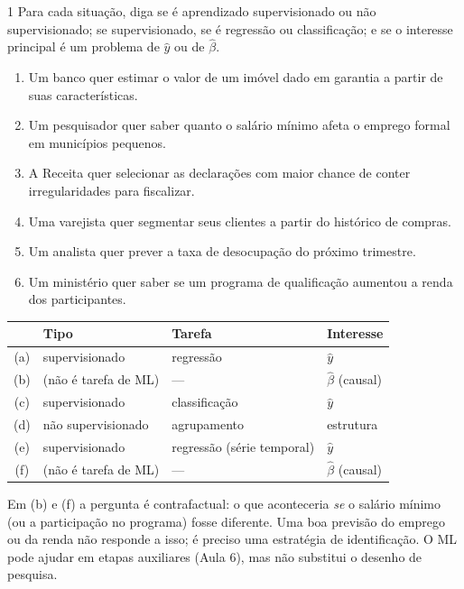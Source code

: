 \documentclass[lista]{tmlnotas}
\begin{document}
\begin{exercicio}{1}
Para cada situação, diga se é aprendizado supervisionado ou não supervisionado;
se supervisionado, se é regressão ou classificação; e se o interesse principal é
um problema de $\hat y$ ou de $\hat\beta$.
\begin{enumerate}[label=(\alph*)]
  \item Um banco quer estimar o valor de um imóvel dado em garantia a partir de
        suas características.
  \item Um pesquisador quer saber quanto o salário mínimo afeta o emprego formal
        em municípios pequenos.
  \item A Receita quer selecionar as declarações com maior chance de conter
        irregularidades para fiscalizar.
  \item Uma varejista quer segmentar seus clientes a partir do histórico de compras.
  \item Um analista quer prever a taxa de desocupação do próximo trimestre.
  \item Um ministério quer saber se um programa de qualificação aumentou a renda dos participantes.
\end{enumerate}
\end{exercicio}
\begin{solucao}
\begin{tabular}{@{}clll@{}}
  \toprule
  & Tipo & Tarefa & Interesse \\
  \midrule
  (a) & supervisionado     & regressão     & $\hat y$ \\
  (b) & (não é tarefa de ML) & ---         & $\hat\beta$ (causal) \\
  (c) & supervisionado     & classificação & $\hat y$ \\
  (d) & não supervisionado & agrupamento   & estrutura \\
  (e) & supervisionado     & regressão (série temporal) & $\hat y$ \\
  (f) & (não é tarefa de ML) & ---         & $\hat\beta$ (causal) \\
  \bottomrule
\end{tabular}

Em (b) e (f) a pergunta é contrafactual: o que aconteceria \emph{se} o salário
mínimo (ou a participação no programa) fosse diferente. Uma boa previsão do
emprego ou da renda não responde a isso; é preciso uma estratégia de
identificação. O ML pode ajudar em etapas auxiliares (Aula 6), mas não substitui
o desenho de pesquisa.
\end{solucao}
\end{document}
